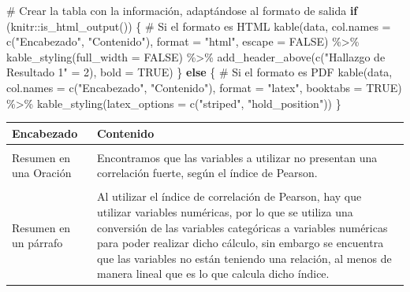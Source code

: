 \documentclass[
  letterpaper,
  DIV=11,
  numbers=noendperiod]{scrreprt}
\newenvironment{Shaded}{\begin{snugshade}}{\end{snugshade}}
\newcommand{\AttributeTok}[1]{\textcolor[rgb]{0.40,0.45,0.13}{#1}}
\newcommand{\CommentTok}[1]{\textcolor[rgb]{0.37,0.37,0.37}{#1}}
\newcommand{\ConstantTok}[1]{\textcolor[rgb]{0.56,0.35,0.01}{#1}}
\newcommand{\ControlFlowTok}[1]{\textcolor[rgb]{0.00,0.23,0.31}{\textbf{#1}}}
\newcommand{\DecValTok}[1]{\textcolor[rgb]{0.68,0.00,0.00}{#1}}
\newcommand{\FunctionTok}[1]{\textcolor[rgb]{0.28,0.35,0.67}{#1}}
\newcommand{\NormalTok}[1]{\textcolor[rgb]{0.00,0.23,0.31}{#1}}
\newcommand{\OtherTok}[1]{\textcolor[rgb]{0.00,0.23,0.31}{#1}}
\newcommand{\SpecialCharTok}[1]{\textcolor[rgb]{0.37,0.37,0.37}{#1}}
\newcommand{\StringTok}[1]{\textcolor[rgb]{0.13,0.47,0.30}{#1}}
\begin{document}
\begin{Shaded}
\begin{Highlighting}[]
\CommentTok{\# Crear la tabla con la información, adaptándose al formato de salida}
\ControlFlowTok{if}\NormalTok{ (knitr}\SpecialCharTok{::}\FunctionTok{is\_html\_output}\NormalTok{()) \{}
  \CommentTok{\# Si el formato es HTML}
  \FunctionTok{kable}\NormalTok{(data, }\AttributeTok{col.names =} \FunctionTok{c}\NormalTok{(}\StringTok{"Encabezado"}\NormalTok{, }\StringTok{"Contenido"}\NormalTok{), }
        \AttributeTok{format =} \StringTok{"html"}\NormalTok{, }
        \AttributeTok{escape =} \ConstantTok{FALSE}\NormalTok{) }\SpecialCharTok{\%\textgreater{}\%}
    \FunctionTok{kable\_styling}\NormalTok{(}\AttributeTok{full\_width =} \ConstantTok{FALSE}\NormalTok{) }\SpecialCharTok{\%\textgreater{}\%}
    \FunctionTok{add\_header\_above}\NormalTok{(}\FunctionTok{c}\NormalTok{(}\StringTok{"Hallazgo de Resultado 1"} \OtherTok{=} \DecValTok{2}\NormalTok{), }\AttributeTok{bold =} \ConstantTok{TRUE}\NormalTok{)}
\NormalTok{\} }\ControlFlowTok{else}\NormalTok{ \{}
  \CommentTok{\# Si el formato es PDF}
  \FunctionTok{kable}\NormalTok{(data, }\AttributeTok{col.names =} \FunctionTok{c}\NormalTok{(}\StringTok{"Encabezado"}\NormalTok{, }\StringTok{"Contenido"}\NormalTok{), }
        \AttributeTok{format =} \StringTok{"latex"}\NormalTok{, }
        \AttributeTok{booktabs =} \ConstantTok{TRUE}\NormalTok{) }\SpecialCharTok{\%\textgreater{}\%}
    \FunctionTok{kable\_styling}\NormalTok{(}\AttributeTok{latex\_options =} \FunctionTok{c}\NormalTok{(}\StringTok{"striped"}\NormalTok{, }\StringTok{"hold\_position"}\NormalTok{))}
\NormalTok{\}}
\end{Highlighting}
\end{Shaded}

\begin{table}[!h]
\centering
\begin{tabular}{ll}
\toprule
Encabezado & Contenido\\
\midrule
\cellcolor{gray!10}{Nombre de Su hallazgo} & \cellcolor{gray!10}{Poca Correlación entre las variables.}\\
Resumen en una Oración & Encontramos que las variables a utilizar no presentan una correlación fuerte, según el índice de Pearson.\\
\cellcolor{gray!10}{Problemas o Posibles Desafíos} & \cellcolor{gray!10}{La conversión de variable categórica a variable numérica puede estar afectando al resultado. Además, podría ser que la relación entre las variables en realidad no es lineal.}\\
Resumen en un párrafo & Al utilizar el índice de correlación de Pearson, hay que utilizar variables numéricas, por lo que se utiliza una conversión de las variables categóricas a variables numéricas para poder realizar dicho cálculo, sin embargo se encuentra que las variables no están teniendo una relación, al menos de manera lineal que es lo que calcula dicho índice.\\
\bottomrule
\end{tabular}
\end{table}
\end{document}
